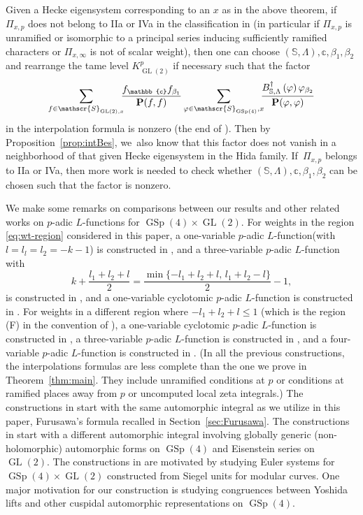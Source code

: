 \documentclass[JEP,XML,SOM,Unicode,published]{cedram}
\newcommand{\Lfunction}{$L$\nobreakdash-func\-tion\xspace}
\newcommand{\Lfunctions}{$L$\nobreakdash-func\-tions\xspace}
\theoremstyle{plain}
\theoremstyle{remark}
\newcommand{\bS}{\mathbb{S}}
\newcommand{\bbc}{\mathbb{c}}
\newcommand{\sS}{\mathscr{S}}
\newcommand{\bfP}{\mathbf{P}}
\DeclareMathOperator{\GL}{GL}
\DeclareMathOperator{\GSp}{GSp}
\let\bes B
\begin{document}
Given a Hecke eigensystem corresponding to an $x$ as in the above theorem, if $\Pi_{x,p}$ does not belong to IIa or IVa in the classification in \cite{RSLocal} (in particular if $\Pi_{x,p}$ is unramified or isomorphic to a principal series inducing sufficiently ramified characters or $\Pi_{x,\infty}$ is not of scalar weight), then one can choose $(\bS,\Lambda),\bbc,\beta_1,\beta_2$ and rearrange the tame level $K^p_{\GL(2)}$ if necessary such that the factor\vspace*{-7pt}
\[
\sum\limits_{f\in \sS_{\GL(2),x}} \hspace{-0.5em}\frac{f_{\bbc}f_{\beta_1}}{\bfP(f,f)}\sum\limits_{\varphi\in \sS_{\GSp(4)},x}\hspace{-0.5em} \frac{\bes^\dagger_{\bS,\Lambda}\left(\varphi\right)\varphi_{\beta_2}}{\bfP(\varphi,\varphi)}
\]
in the interpolation formula is nonzero (\cf the end of \cite{pFL}). Then by Proposition~\ref{prop:intBes}, we~also know that this factor does not vanish in a neighborhood of that given Hecke eigensystem in the Hida family. If~$\Pi_{x,p}$ belongs to IIa or IVa, then more work is needed to check whether $(\bS,\Lambda),\bbc,\beta_1,\beta_2$ can be chosen such that the factor is nonzero.

We make some remarks on comparisons between our results and other related works on $p$-adic \Lfunctions for $\GSp(4)\times\GL(2)$. For weights in the region \eqref{eq:wt-region} considered in this paper, a one-variable $p$-adic \Lfunction (with $l=l_l=l_2=-k-1$) is constructed in \cite{Agarwal}, and a three-variable $p$-adic \Lfunction with\vspace*{-3pt}\enlargethispage{.5\baselineskip}
\[
k+\frac{l_1+l_2+l}{2}=\frac{\min\{-l_1+l_2+l,\,l_1+l_2-l\}}{2}-1,
\]
is constructed in \cite{LoRi}, and a one-variable cyclotomic $p$-adic \Lfunction is constructed in \cite{pFL}. For weights in a different region where $-l_1+l_2+l\leq 1$ (which is the region (F) in the convention of \cite{LoRi}), a one-variable cyclotomic $p$-adic \Lfunction is constructed in \cite{LPSZ}, a three-variable $p$-adic \Lfunction is constructed in \cite{LoZe}, and a four-variable $p$-adic \Lfunction is constructed in \cite{GrahamRockwood}. (In all the previous constructions, the interpolations formulas are less complete than the one we prove in Theorem~\ref{thm:main}. They include unramified conditions at $p$ or conditions at ramified places away from $p$ or uncomputed local zeta integrals.) The constructions in \cite{Agarwal,pFL} start with the same automorphic integral as we utilize in this paper, \ie Furusawa's formula recalled in Section~\ref{sec:Furusawa}. The constructions in \cite{LPSZ,LoZe,LoRi,GrahamRockwood} start with a different automorphic integral involving globally generic (non-holomorphic) automorphic forms on $\GSp(4)$ and Eisenstein series on $\GL(2)$. The constructions in \cite{LPSZ,LoZe,LoRi} are motivated by studying Euler systems for $\GSp(4)\times\GL(2)$ constructed from Siegel units for modular curves. One major motivation for our construction is studying congruences between Yoshida lifts and other cuspidal automorphic representations on $\GSp(4)$.
\end{document}
